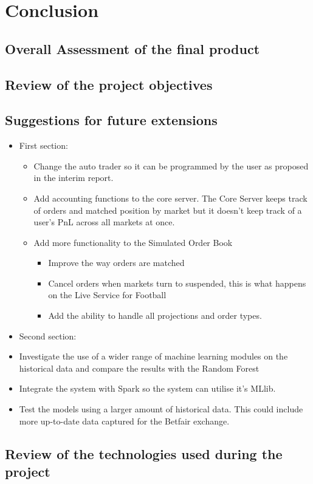 \chapter{Conclusion}
	\section{Overall Assessment of the final product}

	\section{Review of the project objectives}

	\section{Suggestions for future extensions}
	
		\begin{itemize}
			\item First section:
			\begin{itemize}
				\item Change the auto trader so it can be programmed by the user as proposed in the interim report.
				\item Add accounting functions to the core server. The Core Server keeps track of orders and matched position by market but it doesn't keep track of a user's PnL across all markets at once.
				\item Add more functionality to the Simulated Order Book
				\begin{itemize}
					\item Improve the way orders are matched
					\item Cancel orders when markets turn to suspended, this is what happens on the Live Service for Football
					\item Add the ability to handle all projections and order types.
				\end{itemize}
			\end{itemize}

			\item Second section:
				\item Investigate the use of a wider range of machine learning modules on the historical data and compare the results with the Random Forest
				\item Integrate the system with Spark so the system can utilise it's MLlib.
				\item Test the models using a larger amount of historical data. This could include more up-to-date data captured for the Betfair exchange.
		\end{itemize}			
	
	\section{Review of the technologies used during the project}
